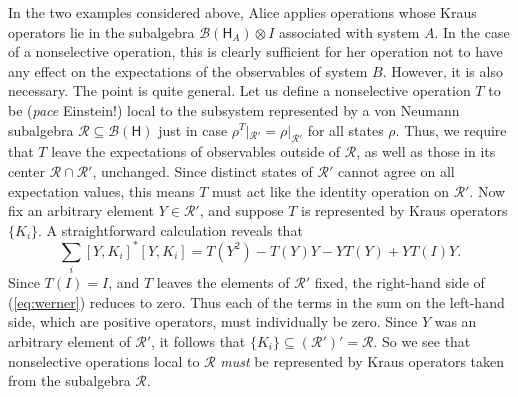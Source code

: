 \documentclass[12pt]{article}
\newcommand{\alg}[1]{\mbox{$\mathcal{#1}$}}
\newcommand{\hil}[1]{\mbox{$\mathsf{#1}$}}
\begin{document}
In the two examples considered above, 
Alice
applies operations whose Kraus operators 
lie in the subalgebra $\alg{B}(\hil{H}_{A})\otimes I$ 
associated with system $A$.  
In the case of a nonselective operation, this is clearly sufficient
for her operation not to have any effect on the 
expectations of the observables of system $B$.  However, it is also necessary.  The point is quite 
general. Let us define a 
nonselective operation $T$ to be (\emph{pace} Einstein!) local to the subsystem
represented by a von Neumann subalgebra 
$\alg{R}\subseteq\alg{B}(\hil{H})$ just in case  
$\rho^{T}|_{\alg{R'}}=\rho|_{\alg{R'}}$ for all states $\rho$.  Thus, 
we require that $T$ 
leave the expectations of observables outside of $\alg{R}$, as well 
as those in its 
center $\alg{R}\cap\alg{R}'$, unchanged.  Since distinct 
states of $\alg{R}'$ cannot 
agree on all expectation values, this means $T$ must act like 
the identity operation on $\alg{R}'$.  Now fix an arbitrary 
element $Y\in\alg{R}'$, and 
suppose $T$ is represented by Kraus operators $\{K_{i}\}$.  A 
straightforward calculation reveals that
\begin{equation} \label{eq:werner}
\sum_{i}[Y,K_{i}]^{*}[Y,K_{i}]=T(Y^{2})-T(Y)Y-YT(Y)+YT(I)Y.
\end{equation}
Since $T(I)=I$, and $T$ leaves the elements of $\alg{R}'$ fixed, 
the right-hand side of (\ref{eq:werner}) reduces to zero.  
Thus each of the terms in the sum on 
the left-hand side, which are positive operators, must 
individually be zero.  Since $Y$ was an arbitrary element 
of $\alg{R}'$, it 
follows that $\{K_{i}\}\subseteq (\alg{R}')'=\alg{R}$.  So we see that 
nonselective operations local to $\alg{R}$ \emph{must} be represented by Kraus 
operators taken from the subalgebra $\alg{R}$.  
\end{document}
